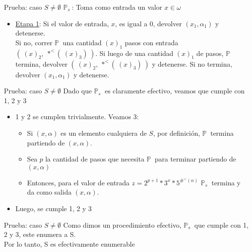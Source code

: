 \documentclass[10pt]{beamer}
\newcommand{\p}{\mathbb{P}}
\begin{document}
\begin{frame}{Prueba: caso $S \neq \emptyset$}
  \underline{$\p_{s}\ $}: Toma como entrada un valor $x \in \omega$
  \begin{itemize}[<+->]
    \item[ ] \underline{Etapa 1}: Si el valor de entrada, $x$, es igual a $0$,
    devolver $(x_{1}, \alpha_{1})$ y detenerse. \\
    Si no, correr $\p\ $ una cantidad $(x)_{1}$ pasos con entrada
    $(\ (x)_{2},\ *^{<}(\ (x)_{3})\ )$. Si luego de una cantidad $(x)_{1}$
    de pasos, $\p\ $ termina, devolver $(\ (x)_{2},\ *^{<}(\ (x)_{3})\ )$ y
    detenerse. Si no termina, devolver $(x_{1}, \alpha_{1})$ y detenerse.

  \end{itemize}
\end{frame}

\begin{frame}{Prueba: caso $S \neq \emptyset$}
  Dado que $\p_{s}\ $ es claramente efectivo, veamos que cumple con 1, 2 y 3
  \begin{itemize}[<+->]
    \item 1 y 2 se cumplen trivialmente. Veamos 3:
    \begin{itemize}[<+->]
      \item Si $(x, \alpha)$ es un elemento cualquiera de $S$, por definición,
      $\p\ $ termina partiendo de $(x, \alpha)$.
      \item Sea $p$ la cantidad de pasos que necesita $\p\ $ para terminar partiendo
      de $(x, \alpha)$
      \item Entonces, para el valor de entrada
      $z = 2^{p+1} * 3^{x} * 5^{\#^{<}(\alpha)}$ $\p_{s}\ $ termina y da como salida
      $(x, \alpha)$.
    \end{itemize}
    \item Luego, se cumple 1, 2 y 3
  \end{itemize}

\end{frame}


\begin{frame}{Prueba: caso $S \neq \emptyset$}
  Como dimos un procedimiento efectivo, $\p_{s}\ $ que cumple con 1, 2 y 3, este
  enumera a S. \\
  Por lo tanto, S es efectivamente enumerable
\end{frame}
\end{document}
